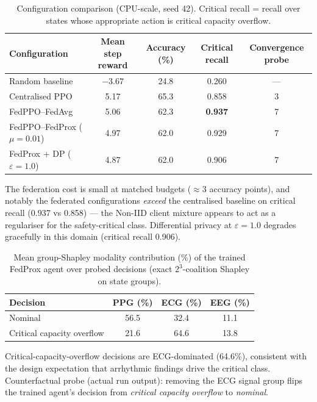 \documentclass[11pt]{article}
\begin{document}
\begin{table}[ht]\centering\small
\caption{Configuration comparison (CPU-scale, seed 42). Critical recall = recall over states whose appropriate action is critical capacity overflow.}
\begin{tabular}{lcccc}
\toprule
\textbf{Configuration} & \textbf{Mean step reward} & \textbf{Accuracy (\%)} & \textbf{Critical recall} & \textbf{Convergence probe}\\
\midrule
Random baseline & $-3.67$ & 24.8 & 0.260 & ---\\
Centralised PPO & 5.17 & 65.3 & 0.858 & 3\\
FedPPO--FedAvg & 5.06 & 62.3 & \textbf{0.937} & 7\\
FedPPO--FedProx ($\mu=0.01$) & 4.97 & 62.0 & 0.929 & 7\\
FedProx + DP ($\varepsilon=1.0$) & 4.87 & 62.0 & 0.906 & 7\\
\bottomrule
\end{tabular}
\end{table}

The federation cost is small at matched budgets ($\approx$3 accuracy points), and notably the federated configurations \emph{exceed} the centralised baseline on critical recall (0.937 vs 0.858) --- the Non-IID client mixture appears to act as a regulariser for the safety-critical class. Differential privacy at $\varepsilon = 1.0$ degrades gracefully in this domain (critical recall 0.906).

\begin{table}[ht]\centering\small
\caption{Mean group-Shapley modality contribution (\%) of the trained FedProx agent over probed decisions (exact $2^3$-coalition Shapley on state groups).}
\begin{tabular}{lccc}
\toprule
\textbf{Decision} & \textbf{PPG (\%)} & \textbf{ECG (\%)} & \textbf{EEG (\%)}\\
\midrule
Nominal & 56.5 & 32.4 & 11.1\\
Critical capacity overflow & 21.6 & 64.6 & 13.8\\
\bottomrule
\end{tabular}
\end{table}

Critical-capacity-overflow decisions are ECG-dominated (64.6\%), consistent with the design expectation that arrhythmic findings drive the critical class. Counterfactual probe (actual run output): removing the ECG signal group flips the trained agent's decision from \emph{critical capacity overflow} to \emph{nominal}.
\end{document}
